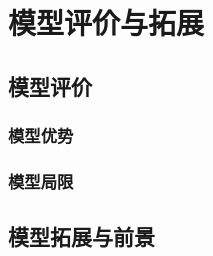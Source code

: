 \section{模型评价与拓展}

\subsection{模型评价}

\subsubsection{模型优势}


\subsubsection{模型局限}


\subsection{模型拓展与前景}


